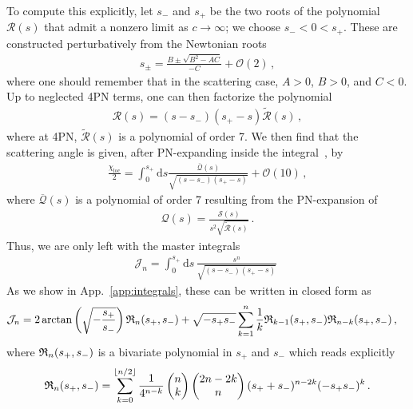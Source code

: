 \documentclass[prd,superscriptaddress,preprintnumbers,tightenlines,nofootinbib, eqsecnum]{revtex4-2}
\renewcommand{\dd}{\mathrm{d}}
\begin{document}
To compute this explicitly, let $s_-$ and $s_+$ be the two roots of the polynomial $\mathcal{R}(s)$ that admit a nonzero limit as $c\rightarrow\infty$; we choose $s_-<0<s_+$. These are constructed perturbatively from the Newtonian roots
\begin{align}
    s_\pm=\frac{B\pm\sqrt{B^2-AC}}{-C} + \mathcal{O}(2) \,,
\end{align}
where one should remember that in the scattering case, $A>0$, $B>0$, and $C<0$. Up to neglected 4PN terms, one can then factorize the polynomial
\begin{align}
    \mathcal{R}(s)=(s-s_-)(s_+-s)\widetilde{\mathcal{R}}(s)\,,
\end{align}
where at 4PN, $\widetilde{\mathcal{R}}(s)$ is a polynomial of order 7. We then find that the scattering angle is given, after PN-expanding inside the integral~\cite{Damour:1988mr}, by
\begin{align}
     \frac{\chi_\text{loc}}{2} = \int_0^{s_+}\dd s \frac{\overline{\mathcal{Q}}(s)}{\sqrt{(s-s_-)(s_+-s)}} + \mathcal{O}(10)\,,
\end{align}
where $\overline{\mathcal{Q}}(s)$ is a polynomial of order 7 resulting from the PN-expansion of 
\begin{align}
    \mathcal{Q}(s)=\frac{\mathcal{S}(s)}{s^2\sqrt{\widetilde{\mathcal{R}}(s)}}\,.
\end{align}
Thus, we are only left with the master integrals
\begin{align}
    \mathcal{J}_n=\int_0^{s_+}\dd s \, \frac{s^n}{\sqrt{(s-s_-)(s_+-s)}} \,\,
\end{align}
As we show in App.~\ref{app:integrals}, these can be written in closed form as
\begin{align}
    \mathcal{J}_n &=      2 \arctan\left(\sqrt{-\frac{s_+}{s_-}}\right)  \frak{R}_n(s_+,s_-)
    + \sqrt{-s_+ s_-}  \sum_{k=1}^{n} \frac{1}{k}    \frak{R}_{k-1}(s_+,s_-)   \frak{R}_{n-k}(s_+,s_-) \,, 
\end{align}
where $\frak{R}_n(s_+,s_-)$ is a bivariate polynomial in $s_+$ and $s_-$ which reads explicitly
\begin{align}
    \frak{R}_n(s_+,s_-) =  \sum_{k=0}^{\lfloor n/2 \rfloor} \frac{1}{4^{n-k}}\begin{pmatrix}
        n\\k
    \end{pmatrix} \begin{pmatrix}
        2n-2k\\n
    \end{pmatrix}  (s_+ + s_-)^{n-2k}(-s_+ s_-)^{k} \,.
\end{align}
\end{document}
